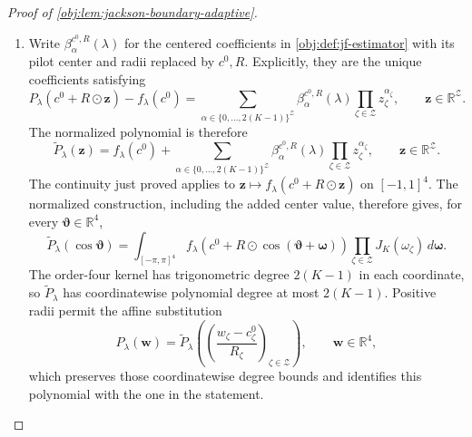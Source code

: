 \begin{proof}[Proof of \cref{obj:lem:jackson-boundary-adaptive}]
\begin{enumerate}
Finally, \(x\mapsto[x]_+\) is one-Lipschitz. Applying this to the hinge in \cref{obj:def:dual-process} gives
\[
|f_\lambda(\mathbf w)-f_\lambda(\mathbf w')|
\leq
2|g_0(\mathbf w)-g_0(\mathbf w')|
+|g_1(\mathbf w)-g_1(\mathbf w')|
+|\lambda|\,|s(\mathbf w)-s(\mathbf w')|
\leq\Lambda_\epsilon\Delta(\mathbf w,\mathbf w').
\]
Since \(\Delta(\mathbf w,\mathbf w')\leq4\|\mathbf w-\mathbf w'\|_\infty\), \(f_\lambda\) is continuous on \(\mathcal R\). %

\item Write \(\beta_\alpha^{c^0,R}(\lambda)\) for the centered coefficients in \cref{obj:def:jf-estimator} with its pilot center and radii replaced by \(c^0,R\). Explicitly, they are the unique coefficients satisfying
\[
P_\lambda(c^0+R\odot\mathbf z)-f_\lambda(c^0)
=
\sum_{\alpha\in\{0,\ldots,2(K-1)\}^{\mathcal Z}}
\beta_\alpha^{c^0,R}(\lambda)
\prod_{\zeta\in\mathcal Z}z_\zeta^{\alpha_\zeta},
\qquad \mathbf z\in\mathbb R^{\mathcal Z}.
\]
The normalized polynomial is therefore
\[
\widetilde P_\lambda(\mathbf z)
=
f_\lambda(c^0)+
\sum_{\alpha\in\{0,\ldots,2(K-1)\}^{\mathcal Z}}
\beta_\alpha^{c^0,R}(\lambda)
\prod_{\zeta\in\mathcal Z}z_\zeta^{\alpha_\zeta},
\qquad \mathbf z\in\mathbb R^{\mathcal Z}.
\]
The continuity just proved applies to
\(\mathbf z\mapsto f_\lambda(c^0+R\odot\mathbf z)\) on \([-1,1]^4\).
The normalized construction, including the added center value, therefore gives, for every \(\boldsymbol\vartheta\in\mathbb R^4\),
\[
\widetilde P_\lambda(\cos\boldsymbol\vartheta)
=
\int_{[-\pi,\pi]^4}
f_\lambda\!\left(c^0+R\odot
\cos(\boldsymbol\vartheta+\boldsymbol\omega)\right)
\prod_{\zeta\in\mathcal Z}J_K(\omega_\zeta)
\,d\boldsymbol\omega.
\]
The order-four kernel has trigonometric degree \(2(K-1)\) in each coordinate, so \(\widetilde P_\lambda\) has coordinatewise polynomial degree at most \(2(K-1)\). Positive radii permit the affine substitution
\[
P_\lambda(\mathbf w)
=
\widetilde P_\lambda\!\left(
\left(\frac{w_\zeta-c^0_\zeta}{R_\zeta}\right)_{\zeta\in\mathcal Z}
\right),
\qquad \mathbf w\in\mathbb R^4,
\]
which preserves those coordinatewise degree bounds and identifies this polynomial with the one in the statement. %


\end{enumerate}
\end{proof}
